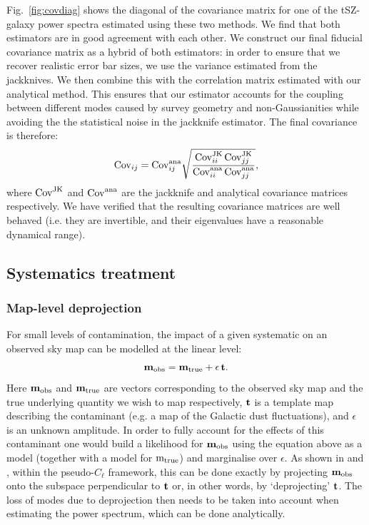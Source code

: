 \documentclass[useAMS,usenatbib]{mn2e}
\begin{document}
    Fig.\!~\ref{fig:covdiag} shows the diagonal of the covariance matrix for one of the tSZ-galaxy power spectra estimated using these two methods. We find that both estimators are in good agreement with each other. We construct our final fiducial covariance matrix as a hybrid of both estimators: in order to ensure that we recover realistic error bar sizes, we use the variance estimated from the jackknives. We then combine this with the correlation matrix estimated with our analytical method. This ensures that our estimator accounts for the coupling between different modes caused by survey geometry and non-Gaussianities while avoiding the the statistical noise in the jackknife estimator. The final covariance is therefore:
    \begin{equation}
      {\rm Cov}_{ij} = {\rm Cov}^{\rm ana}_{ij} \sqrt{\frac{{\rm Cov}^{\rm JK}_{ii}\,{\rm Cov}^{\rm JK}_{jj}}{{\rm Cov}^{\rm ana}_{ii}\,{\rm Cov}^{\rm ana}_{jj}}},
    \end{equation}
    where ${\rm Cov}^{\rm JK}$ and ${\rm Cov}^{\rm ana}$ are the jackknife and analytical covariance matrices respectively. We have verified that the resulting covariance matrices are well behaved (i.e. they are invertible, and their eigenvalues have a reasonable dynamical range).

  \subsection{Systematics treatment}\label{ssec:methods.syst}
    \subsubsection{Map-level deprojection}\label{sssec:methods.syst.deproj}
      For small levels of contamination, the impact of a given systematic on an observed sky map can be modelled at the linear level:
      \begin{equation}
        {\bf m}_{\rm obs}={\bf m}_{\rm true} + \epsilon\,{\bf t}.
      \end{equation}
      Here ${\bf m}_{\rm obs}$ and ${\bf m}_{\rm true}$ are vectors corresponding to the observed sky map and the true underlying quantity we wish to map respectively, ${\bf t}$ is a template map describing the contaminant (e.g. a map of the Galactic dust fluctuations), and $\epsilon$ is an unknown amplitude. In order to fully account for the effects of this contaminant one would build a likelihood for ${\bf m}_{\rm obs}$ using the equation above as a model (together with a model for ${\rm m}_{\rm true}$) and marginalise over $\epsilon$. As shown in \cite{2017MNRAS.465.1847E} and \cite{2019MNRAS.484.4127A}, within the pseudo-$C_\ell$ framework, this can be done exactly by projecting ${\bf m}_{\rm obs}$ onto the subspace perpendicular to ${\bf t}$ or, in other words, by `deprojecting' ${\bf t}$. The loss of modes due to deprojection then needs to be taken into account when estimating the power spectrum, which can be done analytically.
\end{document}
